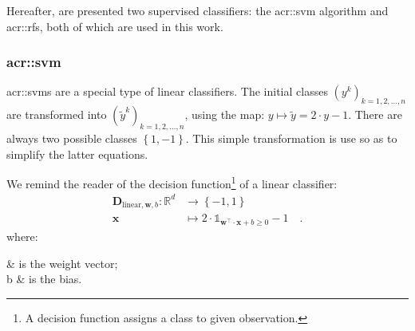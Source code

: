         Hereafter, are presented two supervised classifiers: the \gls{acr::svm} algorithm and \glspl{acr::rf}, both of which are used in this work.

        \subsubsection{\acrlong*{acr::svm}}
            \label{subsubsec::state_of_the_art::mlpr::classifiers::svm}
            \glspl{acr::svm} are a special type of linear classifiers.
            The initial classes $\left(y^k\right)_{k=1, 2, \dots, n}$ are transformed into $\left(\tilde{y}^k\right)_{k=1, 2, \dots, n}$, using the map: $y \mapsto \tilde{y} = 2\cdot y - 1$.
            There are always two possible classes $\left\{1, -1\right\}$.
            This simple transformation is use so as to simplify the latter equations.

            We remind the reader of the decision function\footnote{A decision function assigns a class to given observation.} of a linear classifier:
            \begin{equation}
                \label{eq::linear}
                \begin{aligned}
                    \mathbf{D}_{\text{linear}, \bm{w}, b}: \mathbb{R}^d &\rightarrow \left\{-1, 1\right\}\\
                    \bm{x} &\mapsto 2 \cdot \mathbb{1}_{\bm{w}^\intercal \cdot \bm{x} + b\geq 0} - 1 \quad.
                \end{aligned}
            \end{equation}
            where:
            \begin{conditions}
                 & is the weight vector;\\
                b & is the bias.
            \end{conditions}

